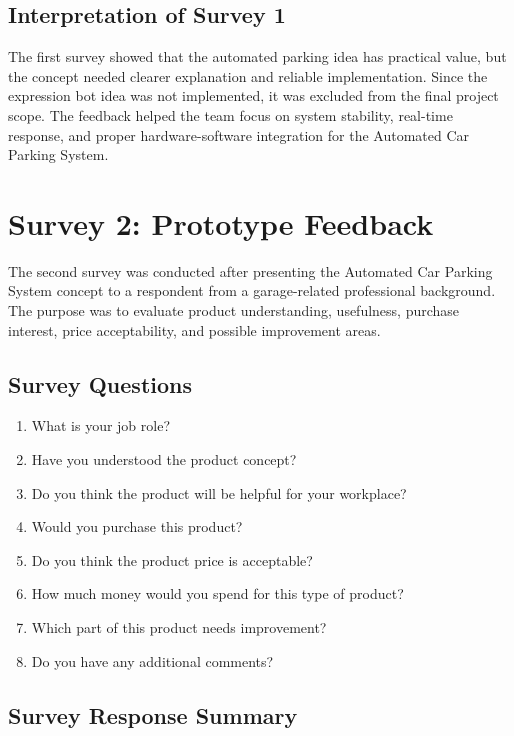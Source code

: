 \subsection*{Interpretation of Survey 1}

The first survey showed that the automated parking idea has practical value, but the concept needed clearer explanation and reliable implementation. Since the expression bot idea was not implemented, it was excluded from the final project scope. The feedback helped the team focus on system stability, real-time response, and proper hardware-software integration for the Automated Car Parking System.

\section{Survey 2: Prototype Feedback}

The second survey was conducted after presenting the Automated Car Parking System concept to a respondent from a garage-related professional background. The purpose was to evaluate product understanding, usefulness, purchase interest, price acceptability, and possible improvement areas.

\subsection*{Survey Questions}

\begin{enumerate}
    \item What is your job role?
    \item Have you understood the product concept?
    \item Do you think the product will be helpful for your workplace?
    \item Would you purchase this product?
    \item Do you think the product price is acceptable?
    \item How much money would you spend for this type of product?
    \item Which part of this product needs improvement?
    \item Do you have any additional comments?
\end{enumerate}

\subsection*{Survey Response Summary}

